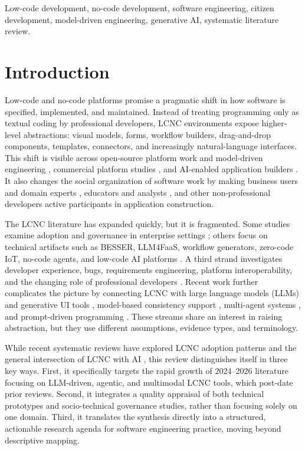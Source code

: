 \documentclass[conference]{IEEEtran}
\begin{document}
\begin{IEEEkeywords}
Low-code development, no-code development, software engineering, citizen development, model-driven engineering, generative AI, systematic literature review.
\end{IEEEkeywords}

\section{Introduction}
Low-code and no-code platforms promise a pragmatic shift in how software is specified, implemented, and maintained. Instead of treating programming only as textual coding by professional developers, LCNC environments expose higher-level abstractions: visual models, forms, workflow builders, drag-and-drop components, templates, connectors, and increasingly natural-language interfaces. This shift is visible across open-source platform work and model-driven engineering \cite{p02,p20}, commercial platform studies \cite{p19,p29}, and AI-enabled application builders \cite{p37,p39}. It also changes the social organization of software work by making business users and domain experts \cite{p13,p14}, educators and analysts \cite{p28,p47}, and other non-professional developers \cite{p18,p49} active participants in application construction.

The LCNC literature has expanded quickly, but it is fragmented. Some studies examine adoption and governance in enterprise settings \cite{p12,p13,p14,p18}; others focus on technical artifacts such as BESSER, LLM4FaaS, workflow generators, zero-code IoT, no-code agents, and low-code AI platforms \cite{p01,p02,p04,p07,p31,p32,p35}. A third strand investigates developer experience, bugs, requirements engineering, platform interoperability, and the changing role of professional developers \cite{p23,p24,p26,p30,p34,p43,p46,p49}. Recent work further complicates the picture by connecting LCNC with large language models (LLMs) and generative UI tools \cite{p03,p06,p08,p22}, model-based consistency support \cite{p10,p33}, multi-agent systems \cite{p32,p40,p41}, and prompt-driven programming \cite{p11,p21,p42,p50}. These streams share an interest in raising abstraction, but they use different assumptions, evidence types, and terminology.

While recent systematic reviews have explored LCNC adoption patterns \cite{p18} and the general intersection of LCNC with AI \cite{p11}, this review distinguishes itself in three key ways. First, it specifically targets the rapid growth of 2024--2026 literature focusing on LLM-driven, agentic, and multimodal LCNC tools, which post-date prior reviews. Second, it integrates a quality appraisal of both technical prototypes and socio-technical governance studies, rather than focusing solely on one domain. Third, it translates the synthesis directly into a structured, actionable research agenda for software engineering practice, moving beyond descriptive mapping.
\end{document}
